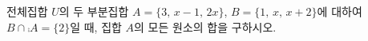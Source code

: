 전체집합 $U$의 두 부분집합 $A=\{3,\,x-1,\,2x\}$, $B=\{1,\,x,\,x+2\}$에 대하여 $B\cap\comp{A}=\{2\}$일 때, 집합 $A$의 모든 원소의 합을 구하시오. 
